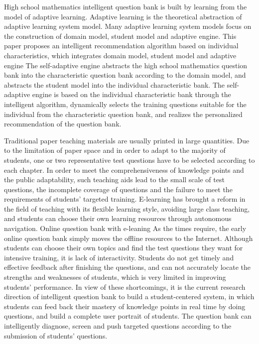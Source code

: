 
High school mathematics intelligent question bank is built by learning from the model of adaptive learning. Adaptive learning is the theoretical abstraction of adaptive learning system model. Many adaptive learning system models focus on the construction of domain model, student model and adaptive engine. This paper proposes an intelligent recommendation algorithm based on individual characteristics, which integrates domain model, student model and adaptive engine The self-adaptive engine abstracts the high school mathematics question bank into the characteristic question bank according to the domain model, and abstracts the student model into the individual characteristic bank. The self-adaptive engine is based on the individual characteristic bank through the intelligent algorithm, dynamically selects the training questions suitable for the individual from the characteristic question bank, and realizes the personalized recommendation of the question bank.

Traditional paper teaching materials are usually printed in large quantities. Due to the limitation of paper space and in order to adapt to the majority of students, one or two representative test questions have to be selected according to each chapter. In order to meet the comprehensiveness of knowledge points and the public adaptability, such teaching aids lead to the small scale of test questions, the incomplete coverage of questions and the failure to meet the requirements of students' targeted training. E-learning has brought a reform in the field of teaching with its flexible learning style, avoiding large class teaching, and students can choose their own learning resources through autonomous navigation. Online question bank with e-leaning As the times require, the early online question bank simply moves the offline resources to the Internet. Although students can choose their own topics and find the test questions they want for intensive training, it is lack of interactivity. Students do not get timely and effective feedback after finishing the questions, and can not accurately locate the strengths and weaknesses of students, which is very limited in improving students' performance. In view of these shortcomings, it is the current research direction of intelligent question bank to build a student-centered system, in which students can feed back their mastery of knowledge points in real time by doing questions, and build a complete user portrait of students. The question bank can intelligently diagnose, screen and push targeted questions according to the submission of students' questions.

